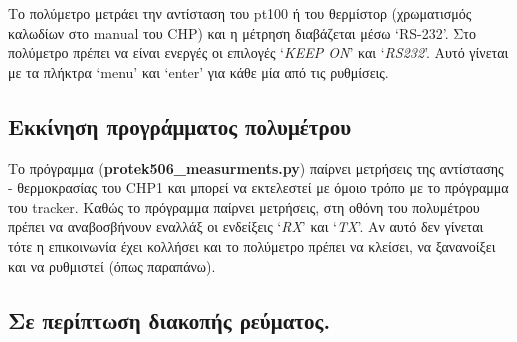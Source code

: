 \documentclass[
  a4paper,
  twoside,
  titlepage,
  12pt]{article}
\numberwithin{equation}{section}
\numberwithin{figure}{section}
\numberwithin{table}{section}
\begin{document}
\vspace{-0.6\baselineskip}

Το πολύμετρο μετράει την αντίσταση του pt100 ή του θερμίστορ (χρωματισμός καλωδίων στο manual του CHP) και η μέτρηση διαβάζεται μέσω `RS-232'.
Στο πολύμετρο πρέπει να είναι ενεργές οι επιλογές `\emph{KEEP ON}' και `\emph{RS232}'. Αυτό γίνεται με τα πλήκτρα `menu' και `enter' για κάθε μία από τις ρυθμίσεις.

\vspace{-1.05\baselineskip}

\hypertarget{ux3b5ux3baux3baux3afux3bdux3b7ux3c3ux3b7-ux3c0ux3c1ux3bfux3b3ux3c1ux3acux3bcux3bcux3b1ux3c4ux3bfux3c2-ux3c0ux3bfux3bbux3c5ux3bcux3adux3c4ux3c1ux3bfux3c5}{%
\subsection*{Εκκίνηση προγράμματος πολυμέτρου}\label{ux3b5ux3baux3baux3afux3bdux3b7ux3c3ux3b7-ux3c0ux3c1ux3bfux3b3ux3c1ux3acux3bcux3bcux3b1ux3c4ux3bfux3c2-ux3c0ux3bfux3bbux3c5ux3bcux3adux3c4ux3c1ux3bfux3c5}}

\vspace{-0.6\baselineskip}

Το πρόγραμμα (\textbf{protek506\_measurments.py}) παίρνει μετρήσεις της αντίστασης - θερμοκρασίας του CHP1 και μπορεί να εκτελεστεί με όμοιο τρόπο με το πρόγραμμα του tracker.
Καθώς το πρόγραμμα παίρνει μετρήσεις, στη οθόνη του πολυμέτρου πρέπει να αναβοσβήνουν εναλλάξ οι ενδείξεις `\emph{RX}' και `\emph{TX}'.
Αν αυτό δεν γίνεται τότε η επικοινωνία έχει κολλήσει και το πολύμετρο πρέπει να κλείσει, να ξανανοίξει και να ρυθμιστεί (όπως παραπάνω).

\vspace{-1.05\baselineskip}

\hypertarget{ux3c3ux3b5-ux3c0ux3b5ux3c1ux3afux3c0ux3c4ux3c9ux3c3ux3b7-ux3b4ux3b9ux3b1ux3baux3bfux3c0ux3aeux3c2-ux3c1ux3b5ux3cdux3bcux3b1ux3c4ux3bfux3c2.}{%
\subsection*{Σε περίπτωση διακοπής ρεύματος.}\label{ux3c3ux3b5-ux3c0ux3b5ux3c1ux3afux3c0ux3c4ux3c9ux3c3ux3b7-ux3b4ux3b9ux3b1ux3baux3bfux3c0ux3aeux3c2-ux3c1ux3b5ux3cdux3bcux3b1ux3c4ux3bfux3c2.}}

\vspace{-0.6\baselineskip}
\end{document}
